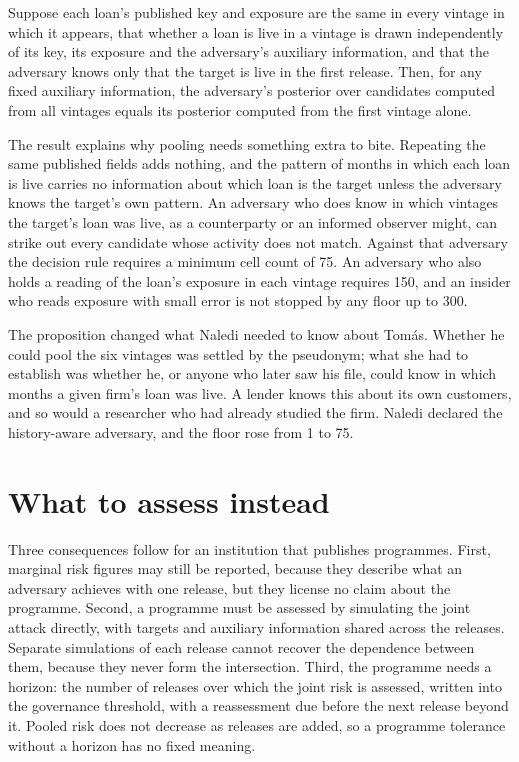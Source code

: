 \begin{proposition}\label{prop:nohistory}
Suppose each loan's published key and exposure are the same in every vintage in
which it appears, that whether a loan is live in a vintage is drawn independently
of its key, its exposure and the adversary's auxiliary information, and that the
adversary knows only that the target is live in the first release. Then, for any
fixed auxiliary information, the adversary's posterior over candidates computed
from all vintages equals its posterior computed from the first vintage alone.
\end{proposition}

The result explains why pooling needs something extra to bite. Repeating the same
published fields adds nothing, and the pattern of months in which each loan is live
carries no information about which loan is the target unless the adversary knows
the target's own pattern. An adversary who does know in which vintages the target's
loan was live, as a counterparty or an informed observer might, can strike out every
candidate whose activity does not match. Against that adversary the decision rule
requires a minimum cell count of 75. An adversary who also holds a reading of the
loan's exposure in each vintage requires 150, and an insider who reads exposure with
small error is not stopped by any floor up to 300.

The proposition changed what Naledi needed to know about Tomás. Whether he could pool the six
vintages was settled by the pseudonym; what she had to establish was whether he, or anyone who
later saw his file, could know in which months a given firm's loan was live. A lender knows this
about its own customers, and so would a researcher who had already studied the firm. Naledi
declared the history-aware adversary, and the floor rose from 1 to 75.

\section{What to assess instead}\label{sec:prog-remedies}

Three consequences follow for an institution that publishes programmes. First,
marginal risk figures may still be reported, because they describe what an
adversary achieves with one release, but they license no claim about the programme.
Second, a programme must be assessed by simulating the joint attack directly, with
targets and auxiliary information shared across the releases. Separate simulations
of each release cannot recover the dependence between them, because they never form
the intersection. Third, the programme needs a horizon: the number of releases over
which the joint risk is assessed, written into the governance threshold, with a
reassessment due before the next release beyond it. Pooled risk does not decrease as
releases are added, so a programme tolerance without a horizon has no fixed meaning.


